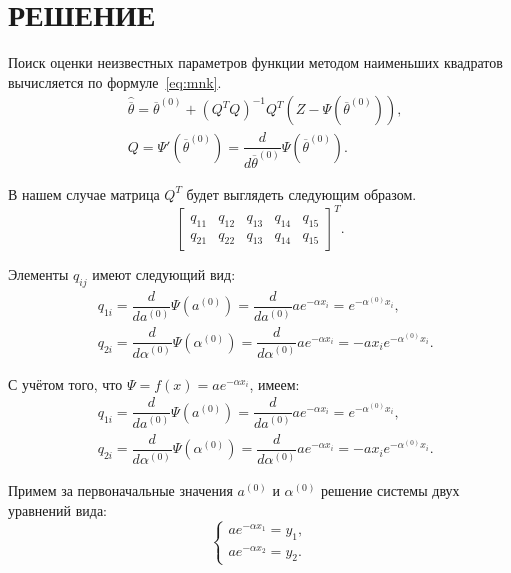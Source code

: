 \section{РЕШЕНИЕ}

Поиск оценки неизвестных параметров функции методом наименьших квадратов
вычисляется по формуле~\ref{eq:mnk}.
\begin{align}
\label{eq:mnk}
  &\widehat{\overline{\theta}} = \overline{\theta}^{(0)} + (Q^T Q)^{-1} Q^T (Z - \Psi( \overline{\theta}^{(0)})), \\
  &Q = \Psi'(\overline{\theta}^{(0)}) = \dfrac{d}{d\overline{\theta}^{(0)}} \Psi(\overline{\theta}^{(0)}). \nonumber
\end{align}

В нашем случае матрица $ Q^T $ будет выглядеть следующим образом.
\[
  \left[
    \begin{array}{ccccc}
      q_{11} & q_{12} & q_{13} & q_{14} & q_{15}  \\
      q_{21} & q_{22} & q_{13} & q_{14} & q_{15}
    \end{array}
  \right]^T.
\]

Элементы $ q_{ij} $ имеют следующий вид:
\begin{align*}
  &q_{1i} = \dfrac{d}{da^{(0)}} \Psi (a^{(0)}) = \dfrac{d}{da^{(0)}} ae^{-\alpha x_i} = e^{-\alpha^{(0)} x_i}, \\
  &q_{2i} = \dfrac{d}{d\alpha^{(0)}} \Psi (\alpha^{(0)}) = \dfrac{d}{d\alpha^{(0)}} ae^{-\alpha x_i} = -a x_i e^{-\alpha^{(0)} x_i}.
\end{align*}


С учётом того, что $ \Psi = f(x) = ae^{-\alpha x_i} $, имеем:
\begin{align*}
  &q_{1i} = \dfrac{d}{da^{(0)}} \Psi (a^{(0)}) = \dfrac{d}{da^{(0)}} ae^{-\alpha x_i} = e^{-\alpha^{(0)} x_i}, \\
  &q_{2i} = \dfrac{d}{d\alpha^{(0)}} \Psi (\alpha^{(0)}) = \dfrac{d}{d\alpha^{(0)}} ae^{-\alpha x_i} = -a x_i e^{-\alpha^{(0)} x_i}.
\end{align*}

Примем за первоначальные значения $ a^{(0)} $ и $ \alpha^{(0)} $ решение
системы двух уравнений вида:
\[
  \left\{
    \begin{array}{c}
      ae^{-\alpha x_1} = y_1, \\
      ae^{-\alpha x_2} = y_2.
    \end{array}
  \right.
\]

